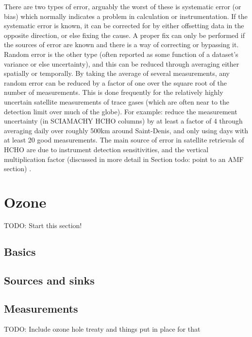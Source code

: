    There are two types of error, arguably the worst of these is systematic error (or bias) which normally indicates a problem in calculation or instrumentation.
    If the systematic error is known, it can be corrected for by either offsetting data in the opposite direction, or else fixing the cause.
    A proper fix can only be performed if the sources of error are known and there is a way of correcting or bypassing it.
    Random error is the other type (often reported as some function of a dataset's variance or else uncertainty), and this can be reduced through averaging either spatially or temporally. 
    By taking the average of several measurements, any random error can be reduced by a factor of one over the square root of the number of measurements.
    This is done frequently for the relatively highly uncertain satellite measurements of trace gases (which are often near to the detection limit over much of the globe).
    For example: \citet{Vigouroux2009} reduce the measurement uncertainty (in SCIAMACHY HCHO columns) by at least a factor of 4 through averaging daily over roughly 500km around Saint-Denis, and only using days with at least 20 good measurements.
    The main source of error in satellite retrievals of HCHO are due to instrument detection sensitivities, and the vertical multiplication factor (discussed in more detail in Section todo: point to an AMF section) \citep{Millet2006}.
    

\section{Ozone}
\label{ch1:sec:Ozone}
TODO: Start this section!
  \subsection{Basics}
    
    
  \subsection{Sources and sinks}
  
  \subsection{Measurements}
  TODO: Include ozone hole treaty and things put in place for that
